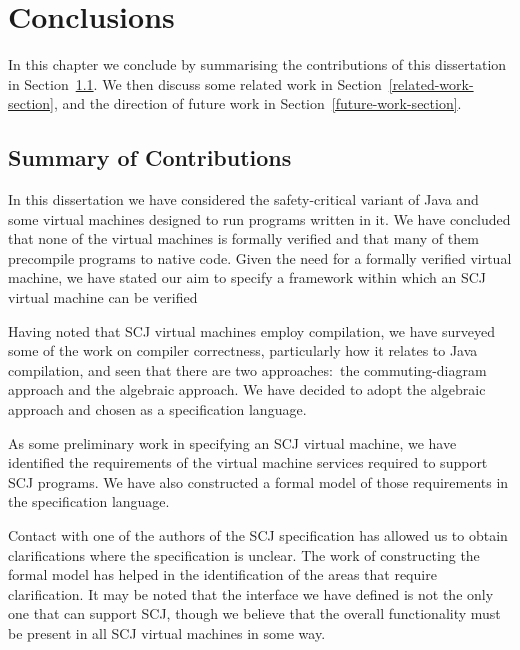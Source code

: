 \documentclass[a4paper,10pt]{report}
\begin{document}

\chapter{Conclusions}
\label{conclusions-chapter}

In this chapter we conclude by summarising the contributions of this
dissertation in Section~\ref{summary-section}.
We then discuss some related work in
Section~\ref{related-work-section}, and the direction of future work
in Section~\ref{future-work-section}.

\section{Summary of Contributions}
\label{summary-section}

In this dissertation we have considered the safety-critical variant of
Java and some virtual machines designed to run programs written in it.
We have concluded that none of the virtual machines is formally
verified and that many of them precompile programs to native code.
Given the need for a formally verified virtual machine, we have stated
our aim to specify a framework within which an SCJ virtual machine can
be verified

Having noted that SCJ virtual machines employ compilation, we have
surveyed some of the work on compiler correctness, particularly how it
relates to Java compilation, and seen that there are two
approaches:~the commuting-diagram approach and the algebraic approach.
We have decided to adopt the algebraic approach and chosen \Circus{}
as a specification language.

As some preliminary work in specifying an SCJ virtual machine, we have
identified the requirements of the virtual machine services required
to support SCJ programs.
We have also constructed a formal model of those requirements in the
\Circus{} specification language.

Contact with one of the authors of the SCJ specification has allowed
us to obtain clarifications where the specification is unclear.
The work of constructing the formal model has helped in the
identification of the areas that require clarification.
It may be noted that the interface we have defined is not the only one
that can support SCJ, though we believe that the overall functionality
must be present in all SCJ virtual machines in some way.
\end{document}
